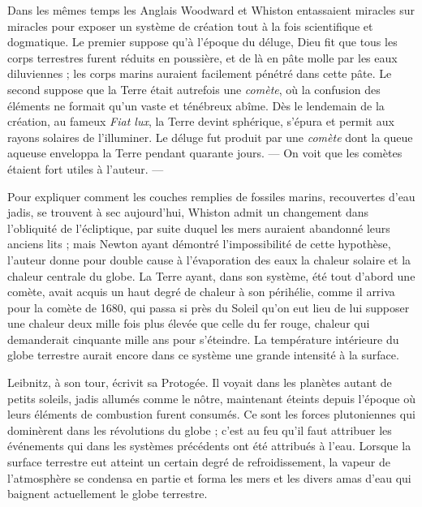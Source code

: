 \documentclass[a4paper, 11pt, oneside, landscape]{article}
\begin{document}
Dans les mêmes temps les Anglais Woodward et Whiston entassaient miracles sur miracles pour exposer un système de création tout à la fois scientifique et dogmatique. Le premier suppose qu'à l'époque du déluge, Dieu fit que tous les corps terrestres furent réduits en poussière, et de là en pâte molle par les eaux diluviennes ; les corps marins auraient facilement pénétré dans cette pâte. Le second suppose que la Terre était autrefois une \emph{comète}, où la confusion des éléments ne formait qu'un vaste et ténébreux abîme. Dès le lendemain de la création, au fameux \emph{Fiat lux}, la Terre devint sphérique, s'épura et permit aux rayons solaires de l'illuminer. Le déluge fut produit par une \emph{comète} dont la queue aqueuse enveloppa la Terre pendant quarante jours. --- On voit que les comètes étaient fort utiles à l'auteur. ---

Pour expliquer comment les couches remplies de fossiles marins, recouvertes d'eau jadis, se trouvent à sec aujourd'hui, Whiston admit un changement dans l'obliquité de l'écliptique, par suite duquel les mers auraient abandonné leurs anciens lits ; mais Newton ayant démontré l'impossibilité de cette hypothèse, l'auteur donne pour double cause à l'évaporation des eaux la chaleur solaire et la chaleur centrale du globe. La Terre ayant, dans son système, été tout d'abord une comète, avait acquis un haut degré de chaleur à son périhélie, comme il arriva pour la comète de 1680, qui passa si près du Soleil qu'on eut lieu de lui supposer une chaleur deux mille fois plus élevée que celle du fer rouge, chaleur qui demanderait cinquante mille ans pour s'éteindre. La température intérieure du globe terrestre aurait encore dans ce système une grande intensité à la surface.

Leibnitz, à son tour, écrivit sa Protogée. Il voyait dans les planètes autant de petits soleils, jadis allumés comme le nôtre, maintenant éteints depuis l'époque où leurs éléments de combustion furent consumés. Ce sont les forces plutoniennes qui dominèrent dans les révolutions du globe ; c'est au feu qu'il faut attribuer les événements qui dans les systèmes précédents ont été attribués à l'eau. Lorsque la surface terrestre eut atteint un certain degré de refroidissement, la vapeur de l'atmosphère se condensa en partie et forma les mers et les divers amas d'eau qui baignent actuellement le globe terrestre.
\end{document}
